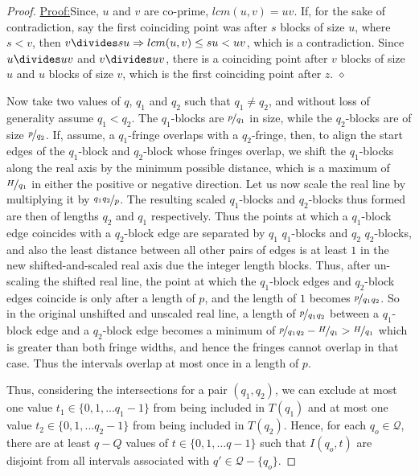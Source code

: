 \documentclass{report}
\newenvironment{claimproof}[1]{\vspace{2.5mm}\par\noindent\underline{Proof:}\space#1}{\hfill $\diamond$ \vspace{2.5mm} \par}
\begin{document}
\begin{proof}
\begin{claimproof}
  Since, $u$ and $v$ are co-prime, $lcm(u,v)=uv$. If, for the sake of contradiction, say the first coinciding point was after $s$ blocks of size $u$, where $s<v$, then $v \divides su\Rightarrow lcm(u,v) \leq su < uv$, which is a contradiction. Since $u\divides uv$ and $v \divides uv$, there is a coinciding point after $v$ blocks of size $u$ and $u$ blocks of size $v$, which is the first coinciding point after $z$.
\end{claimproof}
%
Now take two values of $q$, $q_1$ and $q_2$ such that  $q_1\neq q_2$, and without loss of generality assume $q_1<q_2$. The $q_1$-blocks are $\nicefrac{p}{q_1}$ in size, while the $q_2$-blocks are of size $\nicefrac{p}{q_2}$. If, assume, a $q_1$-fringe overlaps with a $q_2$-fringe, then, to align the start edges of the $q_1$-block and $q_2$-block whose fringes overlap, we shift the $q_1$-blocks along the real axis by the minimum possible distance, which is a maximum of $\nicefrac{H}{q_1}$ in either the positive or negative direction. Let us now scale the real line by multiplying it by $\nicefrac{q_1q_2}{p}$. The resulting scaled $q_1$-blocks and $q_2$-blocks thus formed are then of lengths $q_2$ and $q_1$ respectively. Thus the points at which a $q_1$-block edge coincides with a $q_2$-block edge are separated by $q_1$ $q_1$-blocks and $q_2$ $q_2$-blocks, and also the least distance between all other pairs of edges is at least $1$ in the new shifted-and-scaled real axis due the integer length blocks. Thus, after un-scaling the shifted real line, the point at which the $q_1$-block edges and $q_2$-block edges coincide is only after a length of $p$, and the length of $1$ becomes $\nicefrac{p}{q_1q_2}$. So in the original unshifted and unscaled real line, a length of $\nicefrac{p}{q_1q_2}$ between a $q_1$-block edge and a $q_2$-block edge becomes a minimum of $\nicefrac{p}{q_1q_2}-\nicefrac{H}{q_1}>\nicefrac{H}{q_1}$ which is greater than both fringe widths, and hence the fringes cannot overlap in that case. Thus the intervals overlap at most once in a length of $p$.

Thus, considering the intersections for a pair $(q_1,q_2)$, we can exclude at most one value $t_1\in\{0,1,...q_1-1\}$ from being included in $T(q_1)$ and at most one value $t_2\in\{0,1,...q_2-1\}$ from being included in $T(q_2)$. Hence, for each $q_o\in \mathcal{Q}$, there are at least $q-Q$ values of $t\in \{0,1,\ldots q-1\}$ such that $I(q_o,t)$ are disjoint from all intervals associated with $q'\in \mathcal{Q}-\{q_o\}$.


\end{proof}
\end{document}
